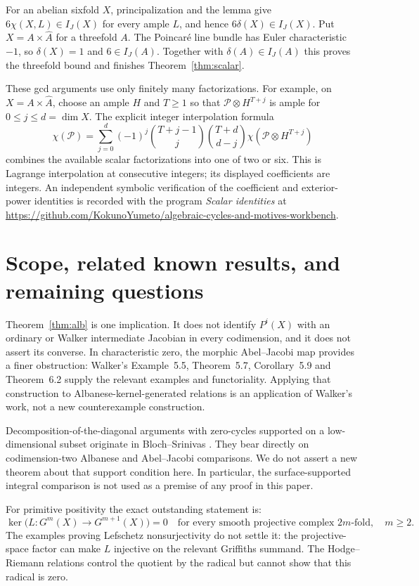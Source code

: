 \documentclass[11pt]{article}
\newcommand{\workbenchurl}{https://github.com/KokunoYumeto/algebraic-cycles-and-motives-workbench}
\theoremstyle{definition}
\theoremstyle{remark}
\begin{document}
For an abelian sixfold $X$, principalization and the lemma give $6\chi(X,L)\in I_J(X)$ for every ample $L$, and hence $6\delta(X)\in I_J(X)$. Put $X=A\times\widehat A$ for a threefold $A$. The Poincar\'e line bundle has Euler characteristic $-1$, so $\delta(X)=1$ and $6\in I_J(A)$. Together with $\delta(A)\in I_J(A)$ this proves the threefold bound and finishes Theorem~\ref{thm:scalar}.

These gcd arguments use only finitely many factorizations. For example, on $X=A\times\widehat A$, choose an ample $H$ and $T\geq1$ so that $\mathcal P\otimes H^{T+j}$ is ample for $0\leq j\leq d=\dim X$. The explicit integer interpolation formula
\[
 \chi(\mathcal P)=\sum_{j=0}^d(-1)^j
   \binom{T+j-1}{j}\binom{T+d}{d-j}
                  \chi(\mathcal P\otimes H^{T+j})
\]
combines the available scalar factorizations into one of two or six. This is Lagrange interpolation at consecutive integers; its displayed coefficients are integers. An independent symbolic verification of the coefficient and exterior-power identities is recorded with the program \emph{Scalar identities} at \url{\workbenchurl}.

\section{Scope, related known results, and remaining questions}

Theorem~\ref{thm:alb} is one implication. It does not identify $P^i(X)$ with an ordinary or Walker intermediate Jacobian in every codimension, and it does not assert its converse. In characteristic zero, the morphic Abel--Jacobi map provides a finer obstruction: Walker's Example~5.5, Theorem~5.7, Corollary~5.9 and Theorem~6.2 \cite[pp.~928, 930, 932--934]{Walker} supply the relevant examples and functoriality. Applying that construction to Albanese-kernel-generated relations is an application of Walker's work, not a new counterexample construction.

Decomposition-of-the-diagonal arguments with zero-cycles supported on a low-dimensional subset originate in Bloch--Srinivas \cite{BlochSrinivas}. They bear directly on codimension-two Albanese and Abel--Jacobi comparisons. We do not assert a new theorem about that support condition here. In particular, the surface-supported integral comparison is not used as a premise of any proof in this paper.

For primitive positivity the exact outstanding statement is:
\[
 \ker\bigl(L:G^m(X)\longrightarrow G^{m+1}(X)\bigr)=0
 \quad\text{for every smooth projective complex }2m\text{-fold},\quad m\geq2.
\]
The examples proving Lefschetz nonsurjectivity do not settle it: the projective-space factor can make $L$ injective on the relevant Griffiths summand. The Hodge--Riemann relations control the quotient by the radical but cannot show that this radical is zero.
\end{document}
